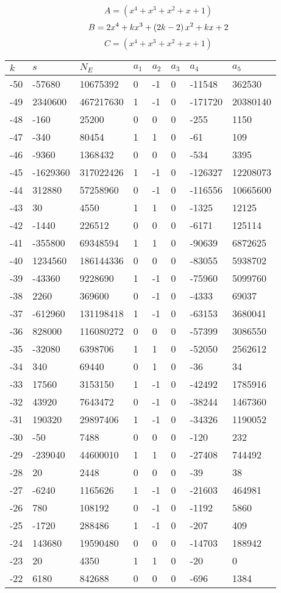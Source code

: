 \documentclass{amsart}
\begin{document}
$$A=(x^4
 + x^3
 + x^2
 + x
 + 1)$$
$$B=2\*x^4
 + k\*x^3
 + \left(2\*k
 - 2\right) \*x^2
 + k\*x
 + 2$$
$$C=(x^4
 + x^3
 + x^2
 + x
 + 1)$$
\begin{longtable}{|l|l|l|lllll|}
\hline
$k$ & $s$ & $N_E$ & $a_1$ & $a_2$ & $a_3$ & $a_4$ & $a_5$\\
\hline
-50&-57680&10675392&0&-1&0&-11548&362530\\
-49&2340600&467217630&1&-1&0&-171720&20380140\\
-48&-160&25200&0&0&0&-255&1150\\
-47&-340&80454&1&1&0&-61&109\\
-46&-9360&1368432&0&0&0&-534&3395\\
-45&-1629360&317022426&1&-1&0&-126327&12208073\\
-44&312880&57258960&0&-1&0&-116556&10665600\\
-43&30&4550&1&1&0&-1325&12125\\
-42&-1440&226512&0&0&0&-6171&125114\\
-41&-355800&69348594&1&1&0&-90639&6872625\\
-40&1234560&186144336&0&0&0&-83055&5938702\\
-39&-43360&9228690&1&-1&0&-75960&5099760\\
-38&2260&369600&0&-1&0&-4333&69037\\
-37&-612960&131198418&1&-1&0&-63153&3680041\\
-36&828000&116080272&0&0&0&-57399&3086550\\
-35&-32080&6398706&1&1&0&-52050&2562612\\
-34&340&69440&0&1&0&-36&34\\
-33&17560&3153150&1&-1&0&-42492&1785916\\
-32&43920&7643472&0&-1&0&-38244&1467360\\
-31&190320&29897406&1&-1&0&-34326&1190052\\
-30&-50&7488&0&0&0&-120&232\\
-29&-239040&44600010&1&1&0&-27408&744492\\
-28&20&2448&0&0&0&-39&38\\
-27&-6240&1165626&1&-1&0&-21603&464981\\
-26&780&108192&0&-1&0&-1192&5860\\
-25&-1720&288486&1&-1&0&-207&409\\
-24&143680&19590480&0&0&0&-14703&188942\\
-23&20&4350&1&1&0&-20&0\\
-22&6180&842688&0&0&0&-696&1384\\

\end{longtable}
\end{document}
